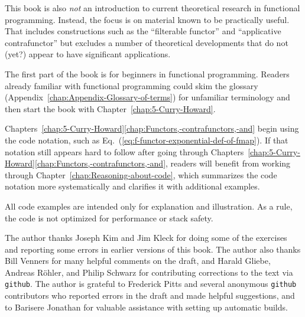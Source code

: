 This book is also \emph{not} an introduction to current theoretical
research in functional programming. Instead, the focus is on material
known to be practically useful. That includes constructions such as
the \textsf{``}filterable functor\textsf{''} and \textsf{``}applicative contrafunctor\textsf{''} but
excludes a number of theoretical developments that do not (yet?) appear
to have significant applications.

The first part of the book is for beginners in functional programming.
Readers already familiar with functional programming could skim the
glossary (Appendix~\ref{chap:Appendix-Glossary-of-terms}) for unfamiliar
terminology and then start the book with Chapter~\ref{chap:5-Curry-Howard}.

Chapters~\ref{chap:5-Curry-Howard}\textendash \ref{chap:Functors,-contrafunctors,-and}
begin using the code notation, such as Eq.~(\ref{eq:f-functor-exponential-def-of-fmap}).
If that notation still appears hard to follow after going through
Chapters~\ref{chap:5-Curry-Howard}\textendash \ref{chap:Functors,-contrafunctors,-and},
readers will benefit from working through Chapter~\ref{chap:Reasoning-about-code},
which summarizes the code notation more systematically and clarifies
it with additional examples.

All code examples are intended only for explanation and illustration.
As a rule, the code is not optimized for performance or stack safety.

The author thanks Joseph Kim and Jim Kleck for doing some of the exercises
and reporting some errors in earlier versions of this book. The author
also thanks Bill Venners for many helpful comments on the draft, and
Harald Gliebe, Andreas R\"ohler, and Philip Schwarz for contributing
corrections to the text via \texttt{github}. The author is grateful
to Frederick Pitts and several anonymous \texttt{github} contributors
who reported errors in the draft and made helpful suggestions, and
to Barisere Jonathan for valuable assistance with setting up automatic
builds.

